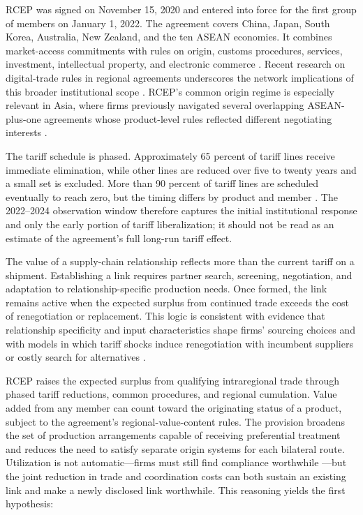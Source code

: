 \documentclass[preprint,12pt,authoryear]{elsarticle}
\begin{document}
RCEP was signed on November 15, 2020 and entered into force for the first group of members on January 1, 2022. The agreement covers China, Japan, South Korea, Australia, New Zealand, and the ten ASEAN economies. It combines market-access commitments with rules on origin, customs procedures, services, investment, intellectual property, and electronic commerce \citep{shen2020rcep,ping2021rcep}. Recent research on digital-trade rules in regional agreements underscores the network implications of this broader institutional scope \citep{li2026digitalrules}. RCEP's common origin regime is especially relevant in Asia, where firms previously navigated several overlapping ASEAN-plus-one agreements whose product-level rules reflected different negotiating interests \citep{hayakawa2022multiple,hayakawa2024negotiating}.

The tariff schedule is phased. Approximately 65 percent of tariff lines receive immediate elimination, while other lines are reduced over five to twenty years and a small set is excluded. More than 90 percent of tariff lines are scheduled eventually to reach zero, but the timing differs by product and member \citep{liu2022rcep}. The 2022--2024 observation window therefore captures the initial institutional response and only the early portion of tariff liberalization; it should not be read as an estimate of the agreement's full long-run tariff effect.

The value of a supply-chain relationship reflects more than the current tariff on a shipment. Establishing a link requires partner search, screening, negotiation, and adaptation to relationship-specific production needs. Once formed, the link remains active when the expected surplus from continued trade exceeds the cost of renegotiation or replacement. This logic is consistent with evidence that relationship specificity and input characteristics shape firms' sourcing choices \citep{garg2023within} and with models in which tariff shocks induce renegotiation with incumbent suppliers or costly search for alternatives \citep{grossman2024tariffs}.

RCEP raises the expected surplus from qualifying intraregional trade through phased tariff reductions, common procedures, and regional cumulation. Value added from any member can count toward the originating status of a product, subject to the agreement's regional-value-content rules. The provision broadens the set of production arrangements capable of receiving preferential treatment and reduces the need to satisfy separate origin systems for each bilateral route. Utilization is not automatic---firms must still find compliance worthwhile \citep{hayakawa2023firm}---but the joint reduction in trade and coordination costs can both sustain an existing link and make a newly disclosed link worthwhile. This reasoning yields the first hypothesis:
\end{document}

